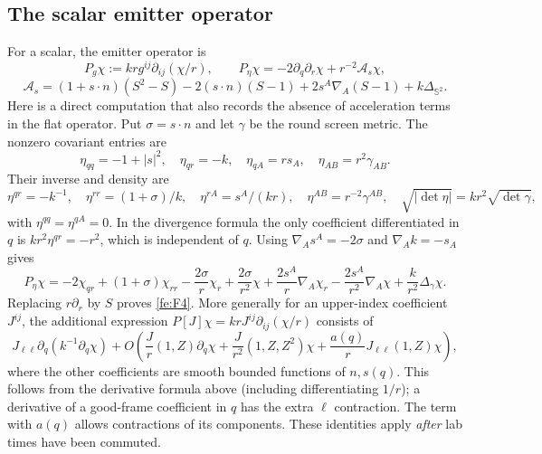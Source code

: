\subsection{The scalar emitter operator}\label{fe:emitter-operator}

For a scalar, the emitter operator is
\begin{equation*}
P_g\chi:=kr g^{ij}\partial_{ij}(\chi/r),\qquad
 P_\eta\chi=-2\partial_q\partial_r\chi+r^{-2}\mathcal A_s\chi ,
\end{equation*}
\begin{equation}\label{fe:F4}
\mathcal A_s=(1+s\cdot n)(S^2-S)-2(s\cdot n)(S-1)
       +2s^A\nabla_A(S-1)+ k\Delta_{\mathbb S^2}.
\end{equation}
Here is a direct computation that also records the absence of acceleration
terms in the flat operator.  Put $\sigma=s\cdot n$ and let $\gamma$ be the
round screen metric.  The nonzero covariant entries are
\begin{equation*}
 \eta_{qq}=-1+|s|^2,\quad \eta_{qr}=-k,\quad
 \eta_{qA}=rs_A,\quad \eta_{AB}=r^2\gamma_{AB}.
\end{equation*}
Their inverse and density are
\begin{equation*}
 \eta^{qr}=-k^{-1},\quad \eta^{rr}=(1+\sigma)/k,\quad
 \eta^{rA}=s^A/(kr),\quad \eta^{AB}=r^{-2}\gamma^{AB},\quad
 \sqrt{|\det\eta|}=kr^2\sqrt{\det\gamma},
\end{equation*}
with $\eta^{qq}=\eta^{qA}=0$.
In the divergence formula the only coefficient differentiated in $q$ is
$kr^2\eta^{qr}=-r^2$, which is independent of $q$.
Using $\nabla_As^A=-2\sigma$ and $\nabla_Ak=-s_A$ gives
\begin{equation*}
 P_\eta\chi=-2\chi_{qr}+(1+\sigma)\chi_{rr}
 -\frac{2\sigma}{r}\chi_r+\frac{2\sigma}{r^2}\chi
 +\frac{2s^A}{r}\nabla_A\chi_r
 -\frac{2s^A}{r^2}\nabla_A\chi+\frac{k}{r^2}\Delta_\gamma\chi.
\end{equation*}
Replacing $r\partial_r$ by $S$ proves \eqref{fe:F4}. More generally for an upper-index coefficient \(J^{ij}\), the additional expression \(P[J]\chi=kr J^{ij}\partial_{ij}(\chi/r)\) consists of
\begin{equation}\label{fe:F5}
J_{\ell\ell}\partial_q(k^{-1}\partial_q\chi)
  + O\left(
    \frac{J}{r}(1,Z)\partial_q\chi+
    \frac{J}{r^2}(1,Z,Z^2)\chi+
    \frac{a(q)}{r}J_{\ell\ell}(1,Z)\chi\right),
\end{equation}
where the other coefficients are smooth bounded functions of \(n,s(q)\). This follows from the derivative formula above (including differentiating \(1/r\)); a derivative of a good-frame coefficient in \(q\) has the extra \(\ell\) contraction. The term with \(a(q)\) allows contractions of its components. These identities apply \emph{after} lab times have been commuted.

